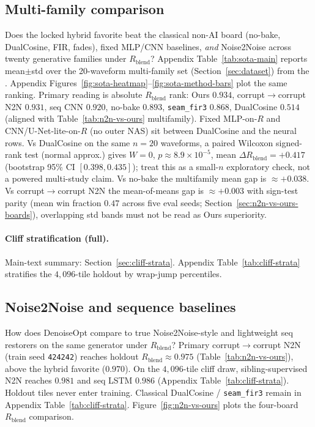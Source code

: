 \subsection{Multi-family comparison}
\label{sec:sota-main}

Does the locked hybrid favorite beat the classical non-AI board (no-bake, DualCosine, FIR, fades),
fixed MLP/CNN baselines, \emph{and} Noise2Noise across twenty generative families under $R_{\mathrm{blend}}$?
Appendix Table~\ref{tab:sota-main} reports mean$\pm$std over the 20-waveform multi-family set (Section~\ref{sec:dataset}) from the .
Appendix Figures~\ref{fig:sota-heatmap}--\ref{fig:sota-method-bars} plot the same ranking.
Primary reading is absolute $R_{\mathrm{blend}}$ rank:
Ours $0.934$, corrupt$\to$corrupt N2N $0.931$, seq CNN $0.920$, no-bake $0.893$,
\texttt{seam\_fir3} $0.868$, DualCosine $0.514$
(aligned with Table~\ref{tab:n2n-vs-ours} multifamily).
Fixed MLP-on-$R$ and CNN/U-Net-lite-on-$R$ (no outer NAS) sit between DualCosine and the neural rows.
Vs DualCosine on the same $n{=}20$ waveforms, a paired Wilcoxon signed-rank test (normal approx.) gives $W{=}0$, $p{\approx}8.9{\times}10^{-5}$, mean $\Delta R_{\mathrm{blend}}{=}{+}0.417$ (bootstrap 95\% CI $[0.398,0.435]$); treat this as a small-$n$ exploratory check, not a powered multi-study claim.
Vs no-bake the multifamily mean gap is $\approx{+}0.038$.
Vs corrupt$\to$corrupt N2N the mean-of-means gap is $\approx{+}0.003$ with sign-test parity (mean win fraction $0.47$ across five eval seeds; Section~\ref{sec:n2n-vs-ours-boards}), overlapping std bands must not be read as Ours superiority.

\paragraph{Cliff stratification (full).}
Main-text summary: Section~\ref{sec:cliff-strata}.
Appendix Table~\ref{tab:cliff-strata} stratifies the $4{,}096$-tile holdout by wrap-jump percentiles.

\subsection{Noise2Noise and sequence baselines}
\label{sec:n2n-baselines}

How does DenoiseOpt compare to true Noise2Noise-style and lightweight seq restorers on the same generator under $R_{\mathrm{blend}}$?
Primary corrupt$\to$corrupt N2N (train seed \texttt{424242}) reaches holdout $R_{\mathrm{blend}}\approx 0.975$ (Table~\ref{tab:n2n-vs-ours}), above the hybrid favorite ($0.970$).
On the $4{,}096$-tile cliff draw, sibling-supervised N2N reaches $0.981$ and seq LSTM $0.986$ (Appendix Table~\ref{tab:cliff-strata}).
Holdout tiles never enter training.
Classical DualCosine / \texttt{seam\_fir3} remain in Appendix Table~\ref{tab:cliff-strata}.
Figure~\ref{fig:n2n-vs-ours} plots the four-board $R_{\mathrm{blend}}$ comparison.

